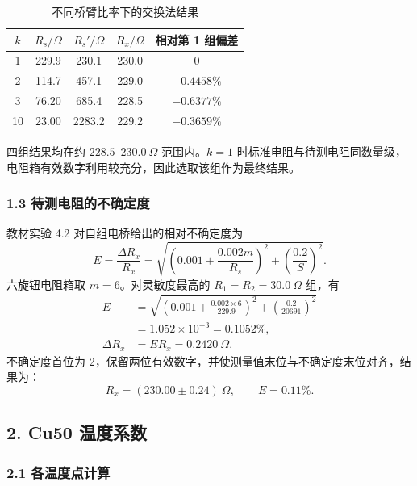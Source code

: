 \begin{table}[H]
  \centering
  \small
  \caption{不同桥臂比率下的交换法结果}
  \begin{tabular}{ccccc}
    \toprule
    $k$ & $R_s/\Omega$ & $R_s'/\Omega$ & $R_x/\Omega$ & 相对第 1 组偏差 \\
    \midrule
    1  & 229.9 & 230.1 & 230.0 & 0 \\
    2  & 114.7 & 457.1 & 229.0 & $-0.4458\%$ \\
    3  & 76.20 & 685.4 & 228.5 & $-0.6377\%$ \\
    10 & 23.00 & 2283.2 & 229.2 & $-0.3659\%$ \\
    \bottomrule
  \end{tabular}
\end{table}

四组结果均在约 $228.5\text{--}230.0\ \Omega$ 范围内。$k=1$ 时标准电阻与待测电阻同数量级，电阻箱有效数字利用较充分，因此选取该组作为最终结果。

\subsubsection*{1.3 待测电阻的不确定度}

教材实验 4.2 对自组电桥给出的相对不确定度为
\begin{equation}
  E=\frac{\Delta R_x}{R_x}
  =\sqrt{\left(0.001+\frac{0.002m}{R_s}\right)^2
  +\left(\frac{0.2}{S}\right)^2}.
\end{equation}
六旋钮电阻箱取 $m=6$。对灵敏度最高的 $R_1=R_2=30.0\ \Omega$ 组，有
\begin{align}
  E
  &=\sqrt{\left(0.001+\frac{0.002\times6}{229.9}\right)^2
  +\left(\frac{0.2}{20691}\right)^2} \\
  &=1.052\times10^{-3}=0.1052\%,\\
  \Delta R_x&=ER_x=0.2420\ \Omega.
\end{align}
不确定度首位为 2，保留两位有效数字，并使测量值末位与不确定度末位对齐，结果为：
\begin{equation}
  \boxed{R_x=(230.00\pm0.24)\ \Omega},
  \qquad \boxed{E=0.11\%}.
\end{equation}

\subsection*{2. Cu50 温度系数}

\subsubsection*{2.1 各温度点计算}

